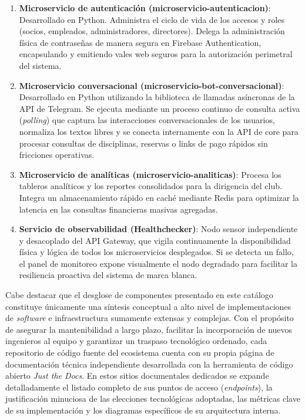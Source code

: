 \begin{enumerate}
    \item \textbf{Microservicio de autenticación (microservicio-autenticacion)}: Desarrollado en Python. Administra el ciclo de vida de los accesos y roles (socios, empleados, administradores, directores). Delega la administración física de contraseñas de manera segura en Firebase Authentication, encapsulando y emitiendo vales web seguros para la autorización perimetral del sistema.
    \item \textbf{Microservicio conversacional (microservicio-bot-conversacional)}: Desarrollado en Python utilizando la biblioteca de llamadas asíncronas de la API de Telegram. Se ejecuta mediante un proceso continuo de consulta activa (\textit{polling}) que captura las interacciones conversacionales de los usuarios, normaliza los textos libres y se conecta internamente con la API de core para procesar consultas de disciplinas, reservas o links de pago rápidos sin fricciones operativas.
    \item \textbf{Microservicio de analíticas (microservicio-analiticas)}: Procesa los tableros analíticos y los reportes consolidados para la dirigencia del club. Integra un almacenamiento rápido en caché mediante Redis para optimizar la latencia en las consultas financieras masivas agregadas.
    \item \textbf{Servicio de observabilidad (Healthchecker)}: Nodo sensor independiente y desacoplado del API Gateway, que vigila continuamente la disponibilidad física y lógica de todos los microservicios desplegados. Si se detecta un fallo, el panel de monitoreo expone visualmente el nodo degradado para facilitar la resiliencia proactiva del sistema de marca blanca.
\end{enumerate}

Cabe destacar que el desglose de componentes presentado en este catálogo constituye únicamente una síntesis conceptual a alto nivel de implementaciones de \textit{software} e infraestructura sumamente extensas y complejas. Con el propósito de asegurar la mantenibilidad a largo plazo, facilitar la incorporación de nuevos ingenieros al equipo y garantizar un traspaso tecnológico ordenado, cada repositorio de código fuente del ecosistema cuenta con su propia página de documentación técnica independiente desarrollada con la herramienta de código abierto \textit{Just the Docs}. En estos sitios documentales dedicados se expande detalladamente el listado completo de sus puntos de acceso (\textit{endpoints}), la justificación minuciosa de las elecciones tecnológicas adoptadas, las métricas clave de su implementación y los diagramas específicos de su arquitectura interna.

